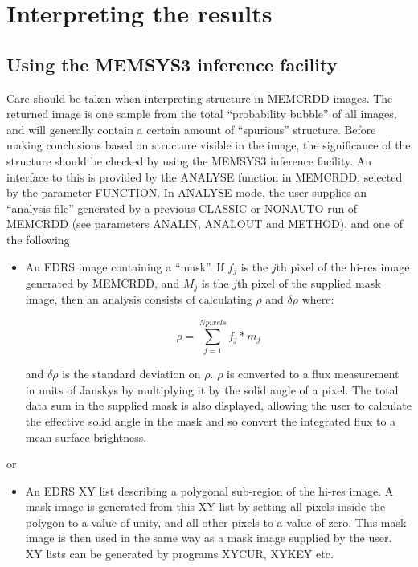 \section {Interpreting the results}
\subsection {Using the MEMSYS3 inference facility}
\label {SEC:INFER}

Care should be taken when interpreting structure in MEMCRDD images. The
returned  image is one sample from the total ``probability bubble'' of all
images, and  will generally contain a certain amount of ``spurious'' structure.
Before making  conclusions based on structure visible in the image, the
significance of the  structure should be checked by using the MEMSYS3 inference
facility. An  interface to this is provided by the ANALYSE function in MEMCRDD,
selected by the parameter FUNCTION. In ANALYSE mode, the user supplies an
``analysis  file'' generated by a previous CLASSIC or NONAUTO run of MEMCRDD
(see parameters ANALIN, ANALOUT and METHOD), and one of the following

\begin{itemize}
\item An EDRS image containing a ``mask''. If $f_{j}$ is the $j$th pixel of
the hi-res image generated by MEMCRDD, and $M_{j}$ is the $j$th pixel of the
supplied mask image, then an analysis consists of calculating $\rho$ and
$\delta\rho$ where:

\begin{equation}
\rho=\sum_{j=1}^{Npixels} f_{j}*m_{j}
\end{equation}

and $\delta\rho$ is the standard deviation on $\rho$. $\rho$ is converted to  a
flux measurement in units of Janskys by multiplying it by the solid angle of a
pixel. The total data sum in the supplied mask is also displayed, allowing the
user to calculate the effective solid angle in the mask and so convert the
integrated flux to a mean surface brightness.

\end{itemize}

or

\begin{itemize}
\item An EDRS XY list describing a polygonal sub-region of the hi-res image. A
mask  image is generated from this XY list by setting all pixels inside the
polygon to  a value of unity, and all other pixels to a value of zero. This
mask image is  then used in the same way as a mask image supplied by the user.
XY lists can be  generated by programs XYCUR, XYKEY etc.
\end{itemize}

